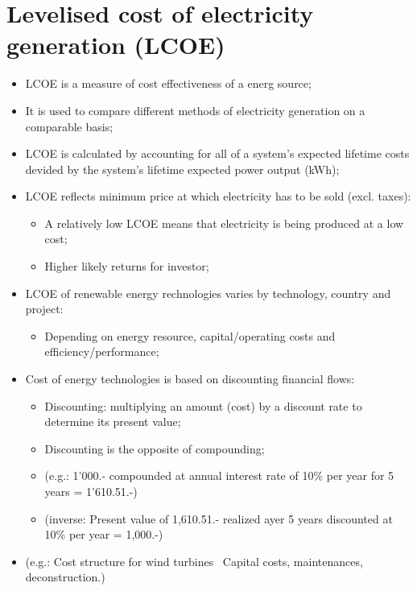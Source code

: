 \documentclass{article}
\newcommand{\tra}{\textrightarrow\ }
\begin{document}
\section{Levelised cost of electricity generation (LCOE)}
\begin{itemize}
    \item LCOE is a measure of cost effectiveness of a energ source;
    \item It is used to compare different methods of electricity generation on a comparable basis;
    \item LCOE is calculated by accounting for all of a system's expected lifetime costs
        devided by the system's lifetime expected power output (kWh);
    \item LCOE reflects minimum price at which electricity has to be sold (excl. taxes):
        \begin{itemize}[label=$\circ$]
            \item A relatively low LCOE means that electricity is being produced at a low cost;
            \item Higher likely returns for investor;
        \end{itemize}
    \item LCOE of renewable energy rechnologies varies by technology, country and project:
        \begin{itemize}[label=$\circ$]
            \item Depending on energy resource, capital/operating costs and efficiency/performance;
        \end{itemize}
    \item Cost of energy technologies is based on discounting financial flows:
        \begin{itemize}[label=$\circ$]
            \item Discounting: multiplying an amount (cost) by a discount rate to determine its present value;
            \item Discounting is the opposite of compounding;
            \item (e.g.: 1'000.- compounded at annual interest rate of 10\% per year for 5 years = 1'610.51.-)
            \item (inverse: Present value of 1,610.51.- realized ayer 5 years discounted at 10\% per year = 1,000.-)
        \end{itemize}
    \item (e.g.: Cost structure for wind turbines \tra Capital costs, maintenances, deconstruction.)
\end{itemize}
\end{document}
